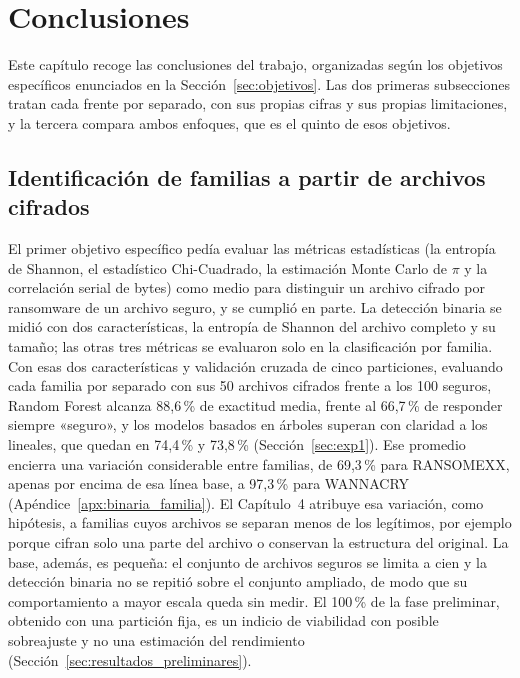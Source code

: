 \section{Conclusiones}

Este capítulo recoge las conclusiones del trabajo, organizadas según los objetivos específicos enunciados en la Sección~\ref{sec:objetivos}. Las dos primeras subsecciones tratan cada frente por separado, con sus propias cifras y sus propias limitaciones, y la tercera compara ambos enfoques, que es el quinto de esos objetivos.

\subsection{Identificación de familias a partir de archivos cifrados}
\label{subsec:concl_archivos}

El primer objetivo específico pedía evaluar las métricas estadísticas (la entropía de Shannon, el estadístico Chi-Cuadrado, la estimación Monte Carlo de $\pi$ y la correlación serial de bytes) como medio para distinguir un archivo cifrado por ransomware de un archivo seguro, y se cumplió en parte. La detección binaria se midió con dos características, la entropía de Shannon del archivo completo y su tamaño; las otras tres métricas se evaluaron solo en la clasificación por familia. Con esas dos características y validación cruzada de cinco particiones, evaluando cada familia por separado con sus 50 archivos cifrados frente a los 100 seguros, Random Forest alcanza 88,6\,\% de exactitud media, frente al 66,7\,\% de responder siempre «seguro», y los modelos basados en árboles superan con claridad a los lineales, que quedan en 74,4\,\% y 73,8\,\% (Sección~\ref{sec:exp1}). Ese promedio encierra una variación considerable entre familias, de 69,3\,\% para RANSOMEXX, apenas por encima de esa línea base, a 97,3\,\% para WANNACRY (Apéndice~\ref{apx:binaria_familia}). El Capítulo~4 atribuye esa variación, como hipótesis, a familias cuyos archivos se separan menos de los legítimos, por ejemplo porque cifran solo una parte del archivo o conservan la estructura del original. La base, además, es pequeña: el conjunto de archivos seguros se limita a cien y la detección binaria no se repitió sobre el conjunto ampliado, de modo que su comportamiento a mayor escala queda sin medir. El 100\,\% de la fase preliminar, obtenido con una partición fija, es un indicio de viabilidad con posible sobreajuste y no una estimación del rendimiento (Sección~\ref{sec:resultados_preliminares}).

